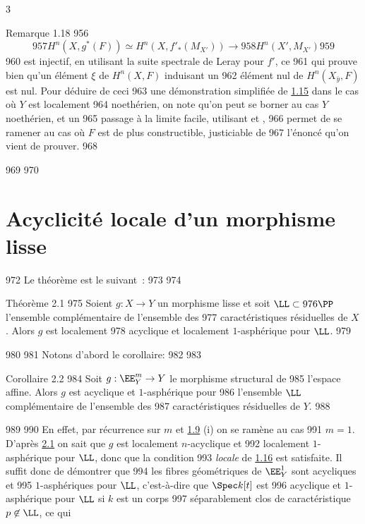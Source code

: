 3	\documentclass[10pt]{../fichiers-configuration-latex/smfart}
\begin{document}
\begin{enonce*}{Remarque 1.18}
   956	$$
   957	H^{n}(X,g^{\ast}(F))\simeq H^{n}(X,f'_{\ast}(M_{X'}))\longrightarrow
   958	H^{n}(X',M_{X'})
   959	$$
   960	est injectif, en utilisant la suite spectrale de Leray pour $f'$, ce
   961	qui prouve bien qu'un élément $\xi$ de $H^{n}(X,F)$ induisant un
   962	élément nul de $H^{n}(X_{\bar{y}},F)$ est nul. Pour déduire de ceci
   963	une démonstration simplifiée de \hyperref[XV.thm1.15]{1.15} dans le cas où $Y$ est localement
   964	noethérien, on note qu'on peut se borner au cas $Y$ noethérien, et un
   965	passage à la limite facile, utilisant  et ,
   966	permet de se ramener au cas où $F$ est de plus constructible, justiciable de
   967	l'énoncé qu'on vient de prouver.
   968	\end{enonce*}
   969	
   970	\section{Acyclicité locale d'un morphisme lisse}	
   972	Le théorème est le suivant~:
   973	
   974	\begin{enonce*}{Théorème 2.1}
   975	Soient $g:X\rightarrow Y$ un morphisme lisse et soit $\LL\subset
   976	\PP$ l'ensemble complémentaire de l'ensemble des
   977	caractéristiques résiduelles de $X$. Alors $g$ est localement
   978	acyclique et localement $1$-asphérique pour $\LL$.
   979	\end{enonce*}
   980	
   981	Notons d'abord le corollaire:
   982	
   983	\begin{enonce*}{Corollaire 2.2}
   984	Soit $g:\EE^m_Y\rightarrow Y$ le morphisme structural de
   985	l'espace affine. Alors $g$ est acyclique et $1$-asphérique pour
   986	l'ensemble $\LL$ complémentaire de l'ensemble des
   987	caractéristiques résiduelles de $Y$.
   988	\end{enonce*}
   989	
   990	En effet, par récurrence sur $m$ et \hyperref[XV.prop1.9]{1.9} (i) on se ramène au cas
   991	$m=1$. D'après \hyperref[XV.thm2.1]{2.1} on sait que $g$ est localement $n$-acyclique et
   992	localement $1$-asphérique pour $\LL$, donc que la condition
   993	\emph{locale} de \hyperref[XV.cor1.16]{1.16} est satisfaite. Il suffit donc de démontrer que
   994	les fibres géométriques de $\EE^{1}_Y$ sont acycliques et
   995	$1$-asphériques pour $\LL$, c'est-à-dire que $\Spec k[t]$ est
   996	acyclique et $1$-asphérique pour $\LL$ si $k$ est un corps
   997	séparablement clos de caractéristique $p\not\in\LL$, ce qui
\end{document}
